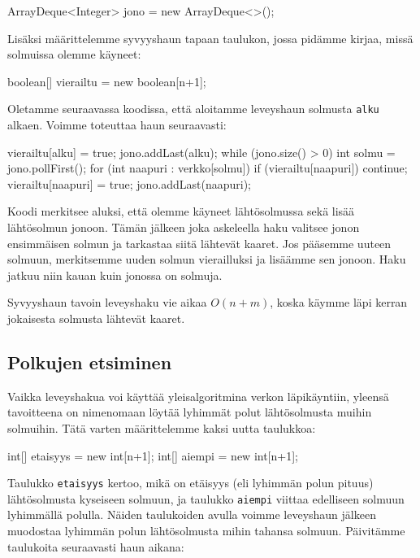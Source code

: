 \begin{code}
ArrayDeque<Integer> jono = new ArrayDeque<>();
\end{code}

Lisäksi määrittelemme syvyyshaun tapaan taulukon, jossa pidämme kirjaa,
missä solmuissa olemme käyneet:

\begin{code}
boolean[] vierailtu = new boolean[n+1];
\end{code}

Oletamme seuraavassa koodissa, että aloitamme leveyshaun solmusta \texttt{alku} alkaen.
Voimme toteuttaa haun seuraavasti:

\begin{code}
vierailtu[alku] = true;
jono.addLast(alku);
while (jono.size() > 0) {
    int solmu = jono.pollFirst();
    for (int naapuri : verkko[solmu]) {
        if (vierailtu[naapuri]) continue;
        vierailtu[naapuri] = true;
        jono.addLast(naapuri);
    }
}
\end{code}

Koodi merkitsee aluksi, että olemme käyneet lähtösolmussa
sekä lisää lähtösolmun jonoon.
Tämän jälkeen joka askeleella haku valitsee
jonon ensimmäisen solmun ja tarkastaa siitä lähtevät kaaret.
Jos pääsemme uuteen solmuun, merkitsemme uuden solmun
vierailluksi ja lisäämme sen jonoon.
Haku jatkuu niin kauan kuin jonossa on solmuja.

Syvyyshaun tavoin leveyshaku vie aikaa $O(n+m)$,
koska käymme läpi kerran jokaisesta solmusta lähtevät kaaret.

\subsection{Polkujen etsiminen}

Vaikka leveyshakua voi käyttää yleisalgoritmina verkon läpikäyntiin,
yleensä tavoitteena on nimenomaan löytää lyhimmät polut lähtösolmusta
muihin solmuihin. Tätä varten määrittelemme kaksi uutta taulukkoa:

\begin{code}
int[] etaisyys = new int[n+1];
int[] aiempi = new int[n+1];
\end{code}

Taulukko \texttt{etaisyys} kertoo, mikä on etäisyys
(eli lyhimmän polun pituus) lähtösolmusta kyseiseen solmuun,
ja taulukko \texttt{aiempi} viittaa edelliseen solmuun lyhimmällä polulla.
Näiden taulukoiden avulla voimme leveyshaun jälkeen muodostaa
lyhimmän polun lähtösolmusta mihin tahansa solmuun.
Päivitäm\-me taulukoita seuraavasti haun aikana:

